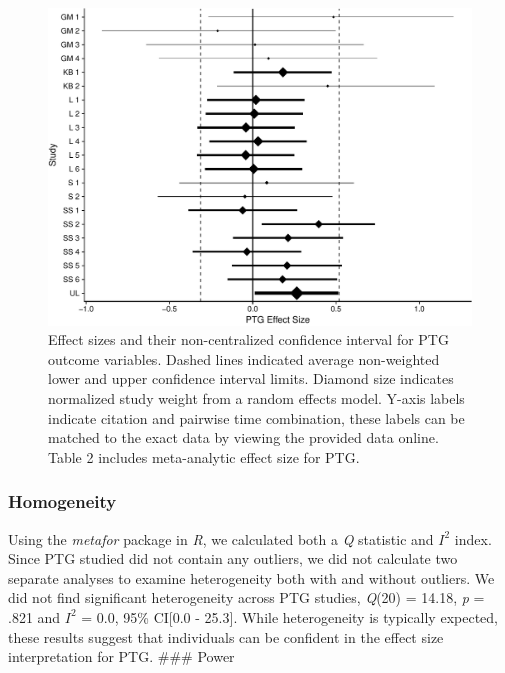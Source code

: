 \documentclass[man]{apa6}
\theoremstyle{definition}
\theoremstyle{definition}
\theoremstyle{definition}
\theoremstyle{remark}
\begin{document}
\begin{figure}[htbp]
\centering
\includegraphics{meta_markdown_files/figure-latex/ptgpic-1.pdf}
\caption{\label{fig:ptgpic}Effect sizes and their non-centralized confidence
interval for PTG outcome variables. Dashed lines indicated average
non-weighted lower and upper confidence interval limits. Diamond size
indicates normalized study weight from a random effects model. Y-axis
labels indicate citation and pairwise time combination, these labels can
be matched to the exact data by viewing the provided data online. Table
2 includes meta-analytic effect size for PTG.}
\end{figure}

\subsubsection{Homogeneity}\label{homogeneity-1}

Using the \emph{metafor} package in \emph{R}, we calculated both a
\emph{Q} statistic and \(I^2\) index. Since PTG studied did not contain
any outliers, we did not calculate two separate analyses to examine
heterogeneity both with and without outliers. We did not find
significant heterogeneity across PTG studies, \emph{Q}(20) = 14.18,
\emph{p} = .821 and \(I^2\) = 0.0, 95\% CI{[}0.0 - 25.3{]}. While
heterogeneity is typically expected, these results suggest that
individuals can be confident in the effect size interpretation for PTG.
\#\#\# Power
\end{document}
